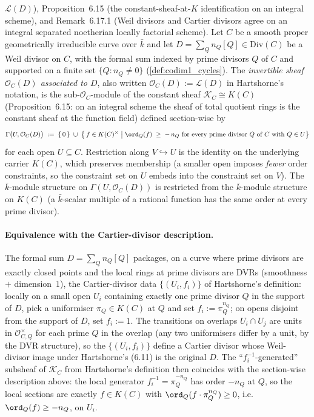 \begin{definition}
{  \(\mathscr L(D)\)), Proposition~6.15 (the constant-sheaf-at-\(K\)
  identification on an integral scheme), and Remark~6.17.1 (Weil
  divisors and Cartier divisors agree on an integral separated
  noetherian locally factorial scheme).}
  Let \(C\) be a smooth proper geometrically irreducible curve over
  \(\bar k\) and let \(D = \sum_{Q} n_Q [Q] \in \mathrm{Div}(C)\) be a Weil divisor
  on \(C\), with the formal sum indexed by prime divisors \(Q\) of \(C\) and
  supported on a finite set \(\{Q : n_Q \neq 0\}\)
  (\cref{def:codim1_cycles}). The \emph{invertible sheaf
  \(\mathcal O_C(D)\) associated to \(D\)}, also written
  \(\mathcal O_C(D) := \mathscr L(D)\) in Hartshorne's notation, is the
  sub-\(\mathcal O_C\)-module of the constant sheaf
  \(\mathcal K_C \cong K(C)\) (Proposition~6.15: on an integral scheme the
  sheaf of total quotient rings is the constant sheaf at the function
  field) defined section-wise by
  \[
    \Gamma\bigl(U, \mathcal O_C(D)\bigr) \;:=\;
    \{\, 0 \,\} \;\cup\;
    \bigl\{\, f \in K(C)^{\times} \;\big|\;
      \ord_Q(f) \;\geq\; -\,n_Q \text{ for every prime divisor }
      Q \text{ of } C \text{ with } Q \in U \bigr\}
  \]
  for each open \(U \subseteq C\). Restriction along \(V \hookrightarrow U\)
  is the identity on the underlying carrier \(K(C)\), which preserves
  membership (a smaller open imposes \emph{fewer} order constraints, so
  the constraint set on \(U\) embeds into the constraint set on \(V\)). The
  \(\bar k\)-module structure on
  \(\Gamma(U, \mathcal O_C(D))\) is restricted from the
  \(\bar k\)-module structure on \(K(C)\) (a \(\bar k\)-scalar multiple of a
  rational function has the same order at every prime divisor).

  \paragraph{Equivalence with the Cartier-divisor description.} The
  formal sum \(D = \sum_Q n_Q [Q]\) packages, on a curve where prime
  divisors are exactly closed points and the local rings at prime
  divisors are DVRs (smoothness \(+\) dimension~\(1\)), the Cartier-divisor
  data \(\{(U_i, f_i)\}\) of Hartshorne's definition: locally on a small
  open \(U_i\) containing exactly one prime divisor \(Q\) in the support of
  \(D\), pick a uniformiser \(\pi_Q \in K(C)\) at \(Q\) and set
  \(f_i := \pi_Q^{n_Q}\); on opens disjoint from the support of \(D\), set
  \(f_i := 1\). The transitions on overlaps \(U_i \cap U_j\) are units in
  \(\mathcal O_{C, Q}^{\times}\) for each prime \(Q\) in the overlap (any
  two uniformisers differ by a unit, by the DVR structure), so the
  \(\{(U_i, f_i)\}\) define a Cartier divisor whose Weil-divisor image
  under Hartshorne's (6.11) is the original \(D\). The
  ``\(f_i^{-1}\)-generated'' subsheaf of \(\mathcal K_C\) from Hartshorne's
  definition then coincides with the section-wise description above:
  the local generator \(f_i^{-1} = \pi_Q^{-n_Q}\) has order \(-n_Q\) at \(Q\),
  so the local sections are exactly \(f \in K(C)\) with
  \(\ord_Q(f \cdot \pi_Q^{n_Q}) \geq 0\), i.e.\ \(\ord_Q(f) \geq -n_Q\), on
  \(U_i\).


\end{definition}
